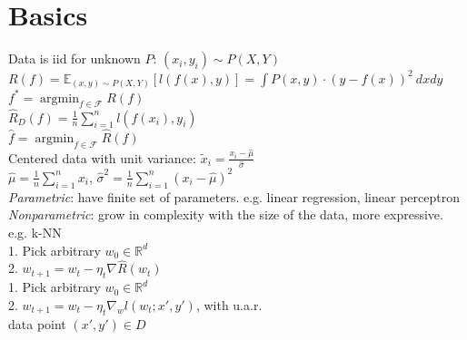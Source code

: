 
\section*{Basics}

Data is iid for unknown $P$: $(x_i, y_i) \sim P(X,Y)$\\
$R(f) = \mathbb{E}_{(x,y)\sim P(X,Y)}[l(f(x),y)] = \int P(x,y) \cdot (y-f(x))^2 \  dx dy$\\
$f^* = \operatorname{argmin}_{f\in\mathcal{F}} R(f)$\\
$\hat{R}_D (f) = \frac{1}{n} \sum_{i = 1}^{n} l (f(x_i),y_i) $\\
$\hat{f} = \operatorname{argmin}_{f\in\mathcal{F}} \hat{R}(f) $\\
Centered data with unit variance:
$\tilde{x}_{i} = \frac{x_{i}-\hat{\mu}}{\hat{\sigma}}$\\
$\hat{\mu} = \frac{1}{n}\sum_{i=1}^n x_{i}$, $\hat{\sigma}^2 = \frac{1}{n}\sum_{i=1}^n {(x_{i}-\hat{\mu})}^2$ \\
\emph{Parametric}: have finite set of parameters. 
e.g. linear regression, linear perceptron\\
\emph{Nonparametric}: grow in complexity with the size of the data, more expressive.
e.g. k-NN
\\
1. Pick arbitrary $w_0 \in \mathbb{R}^d$\\
2. $w_{t+1} = w_t - \eta_t \nabla \hat{R}(w_t)$
\\
1. Pick arbitrary $w_0 \in \mathbb{R}^d$\\
2. $w_{t+1} = w_t - \eta_t \nabla_w l(w_t;x',y')$, with u.a.r.\\ data point $(x',y') \in D$
